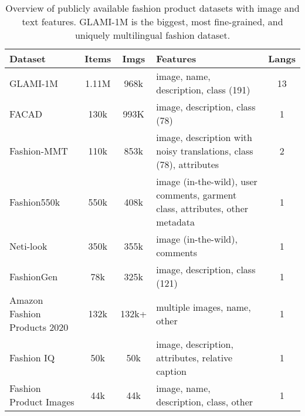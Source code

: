 \documentclass{bmvc2k}
\begin{document}
\begin{table}[h!]
\centering
\small
    \setlength{\tabcolsep}{2pt}
\renewcommand{\arraystretch}{1.2}
\caption{\label{tab:fashion} Overview of publicly available fashion product datasets with image and text features. GLAMI-1M is the biggest, most fine-grained, and uniquely multilingual fashion dataset.}
\vspace{1mm}
\begin{tabular}{|m{3.3cm}|c|c|m{6.4cm}|c|}
\hline
Dataset & Items & Imgs & Features & Langs\\
\hline
GLAMI-1M             & 1.11M & 968k &  image, name, description, class (191) & 13 \\
FACAD \cite{facad}             & 130k & 993K  & image, description, class (78) & 1 \\
Fashion-MMT \cite{fashionMMT}  & 110k & 853k & image, description with noisy translations, class (78), attributes & 2  \\
Fashion550k \cite{fashion550k} & 550k & 408k & image (in-the-wild), user comments, garment class, attributes, other metadata & 1  \\
Neti-look \cite{netilook}      & 350k  & 355k &  image (in-the-wild), comments & 1 \\
FashionGen \cite{fashiongen}   & 78k & 325k  & image, description, class (121) & 1 \\
Amazon Fashion Products 2020 \cite{amazonFashionProducts2020} & 132k & 132k+  & multiple images, name, other & 1 \\
Fashion IQ \cite{fashionIQ}    & 50k  & 50k & image, description, attributes, relative caption & 1 \\
Fashion Product Images \cite{fashionProductImages} & 44k & 44k & image, name, description, class, other & 1 \\
\hline
\end{tabular}
\end{table}
\end{document}
